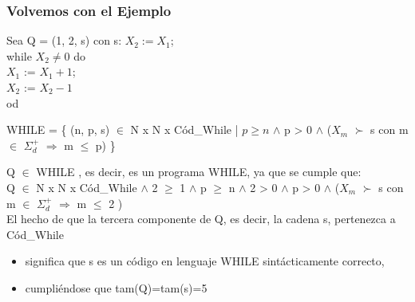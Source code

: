 \documentclass[xcolor=table]{beamer}
\begin{document}
\begin{frame}[fragile]\frametitle{Volvemos con el Ejemplo} \small  
\footnotesize
\begin{block}{}Sea Q = (1, 2, s) con s: \hfill \break
$X_2 := X_1$;\\
while $X_2 \neq 0$ do\\
\hspace{0.5cm}$X_1$ := $X_1 + 1$;\\
\hspace{0.5cm}$X_2$ := $X_2 - 1$\\
od
\end{block}


\begin{center}
 WHILE = \{ (n, p, s) $\in$ N x N x Cód\_While | $p \geq n$ $\wedge$ p > 0 $\wedge$ ($X_m$ 
 $\succ$ s con m $\in$ $\Sigma^+_d$  $\Rightarrow$  m $\leq$  p) \}
 \end{center}

Q $\in$ WHILE , es decir, es un programa WHILE, ya que se cumple que:\\
\hspace{0.5cm}Q $\in$ N x N x Cód\_While $\wedge$ 2 $\geq$ 1 $\wedge$ p $\geq$ n $\wedge$ 2 > 0 $\wedge$  p > 0 $\wedge$ ($X_m$ $\succ$  s con m $\in$ $\Sigma_d^+$ $\Rightarrow$ m $\leq$ 2 ) \\
\hfill \break
\footnotesize
El hecho de que la tercera componente de Q, es decir, la cadena s, pertenezca a Cód\_While
\begin{itemize}
    \item significa que s es un código en lenguaje WHILE sintácticamente correcto,
    \item cumpliéndose que tam(Q)=tam(s)=5
\end{itemize}


\end{frame}
\end{document}
